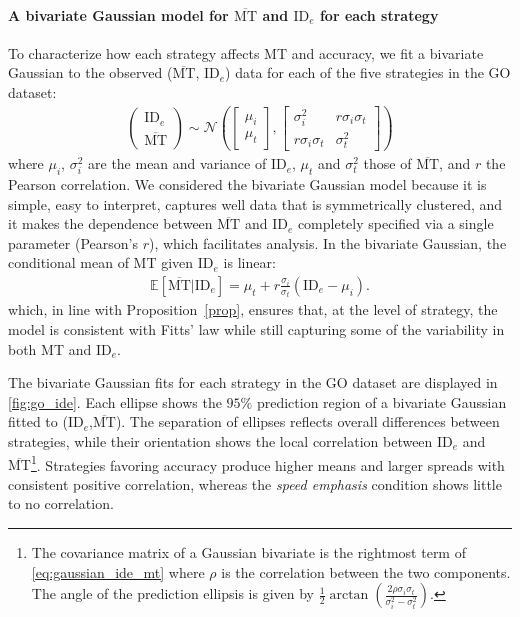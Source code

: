 \documentclass[acmlarge, manuscript,review]{acmart}
\newcommand{\mmt}{\ensuremath{\overline{\mt}}\xspace}
\newcommand{\mt}{\ensuremath{{\text{MT}}}\xspace}
\newcommand{\ide}{\ensuremath{{\text{ID}_e}}\xspace}
\begin{document}
\paragraph{A bivariate Gaussian model for \mmt and \ide for each strategy}
To characterize how each strategy affects MT and accuracy, we fit a bivariate Gaussian to the observed (\mmt, \ide) data for each of the five strategies in the GO dataset:
\begin{align}
  \begin{pmatrix}
    \ide \\
    \mmt
  \end{pmatrix} \sim \mathcal{N} \left(
    \begin{bmatrix}
      \mu_i \\
      \mu_t
    \end{bmatrix},
    \begin{bmatrix}
      \sigma^2_i          & r \sigma_i \sigma_t \\
      r \sigma_i \sigma_t & \sigma_t^2
  \end{bmatrix} \right) \label{eq:gaussian_ide_mt}
\end{align}
where $\mu_i$, $\sigma_i^2$ are the mean and variance of \ide, $\mu_t$ and $\sigma_t^2$ those of \mmt, and $r$ the Pearson correlation.
We considered the bivariate Gaussian model because it is simple, easy to interpret, captures well data that is symmetrically clustered, and it makes the dependence between \mmt and \ide completely specified via a single parameter (Pearson's $r$), which facilitates analysis.
In the bivariate Gaussian, the conditional mean of MT given \ide is linear:
\begin{align}
  \mathbb{E}[\mmt | \ide] = \mu_t + r \frac{\sigma_i}{\sigma_t}(\ide - \mu_i).  \label{eq:mmt_ide_gauss}
\end{align}
which, in line with Proposition~\ref{prop}, ensures that, at the level of strategy, the model is consistent with Fitts' law while still capturing some of the variability in both MT and \ide.

The bivariate Gaussian fits for each strategy in the GO dataset are displayed in \autoref{fig:go_ide}. Each ellipse shows the $95\%$ prediction region of a bivariate Gaussian fitted to (\ide,\mmt). The separation of ellipses reflects overall differences between strategies, while their orientation shows the local correlation between \ide and \mmt\footnote{The covariance matrix of a Gaussian bivariate is the rightmost term of \autoref{eq:gaussian_ide_mt} where $\rho$ is the correlation between the two components. The angle of the prediction ellipsis is given by $\frac{1}{2} \arctan \left( \frac{2\rho \sigma_i\sigma_t}{\sigma_i^2 - \sigma_t^2} \right) $.}. Strategies favoring accuracy produce higher means and larger spreads with consistent positive correlation, whereas the \textit{speed emphasis} condition shows little to no correlation.%
\end{document}
